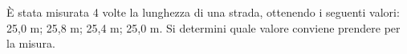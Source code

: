 È stata misurata 4 volte la lunghezza di una strada, 
ottenendo i seguenti valori:
25,0 m;		25,8 m;
25,4 m;		25,0 m.
Si determini quale valore conviene prendere per la misura.